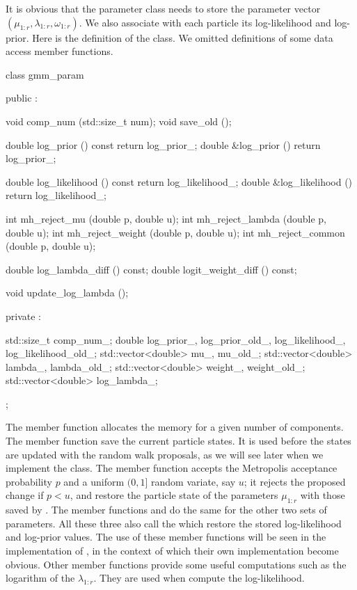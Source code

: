 \documentclass[11pt, bib, hyper, mint, minted=cache]{marticle}
\begin{document}
It is obvious that the parameter class  needs to store
the parameter vector $(\mu_{1:r},\lambda_{1:r},\omega_{1:r})$. We also
associate with each particle its log-likelihood and log-prior. Here is the
definition of the  class. We omitted definitions of some
data access member functions.
\begin{cppcode}
class gmm_param
{
    public :

    void comp_num (std::size_t num);
    void save_old ();

    double log_prior () const {return log_prior_;}
    double &log_prior () {return log_prior_;}

    double log_likelihood () const {return log_likelihood_;}
    double &log_likelihood () {return log_likelihood_;}

    int mh_reject_mu (double p, double u);
    int mh_reject_lambda (double p, double u);
    int mh_reject_weight (double p, double u);
    int mh_reject_common (double p, double u);

    double log_lambda_diff () const;
    double logit_weight_diff () const;

    void update_log_lambda ();

    private :

    std::size_t comp_num_;
    double log_prior_, log_prior_old_, log_likelihood_, log_likelihood_old_;
    std::vector<double> mu_, mu_old_;
    std::vector<double> lambda_, lambda_old_;
    std::vector<double> weight_, weight_old_;
    std::vector<double> log_lambda_;
};
\end{cppcode}
The  member function allocates the memory for a given
number of components. The  member function save the
current particle states. It is used before the states are updated with the
random walk proposals, as we will see later when we implement the
 class. The  member function
accepts the Metropolis acceptance probability $p$ and a uniform $(0,1]$ random
variate, say $u$; it rejects the proposed change if $p < u$, and restore the
particle state of the parameters $\mu_{1:r}$ with those saved by
. The member functions  and
 do the same for the other two sets of parameters.
All these three also call the  which restore the
stored log-likelihood and log-prior values. The use of these member functions
will be seen in the implementation of , in the context
of which their own implementation become obvious. Other member functions
provide some useful computations such as the logarithm of the $\lambda_{1:r}$.
They are used when compute the log-likelihood.
\end{document}
